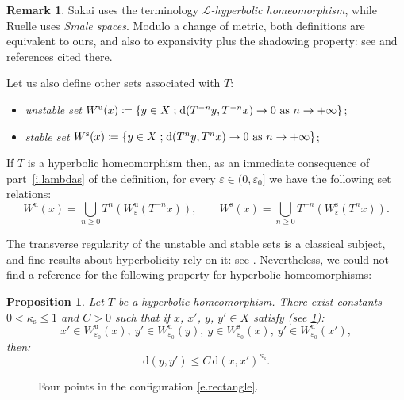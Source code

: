 \documentclass[JEP,XML,SOM,Unicode]{cedram}
\let\mathcal\mathscr
\def\vcentcolon{\mathrel{\mathop\ordinarycolon}}
\providecommand\ordinarycolon{:}
\providecommand*\coloneqq{\vcentcolon\mathrel{\mkern-1.2mu}=}
\theoremstyle{plain}
\newtheorem{proposition}[theorem]{Proposition}
\theoremstyle{definition}
\newtheorem{remark}[theorem]{Remark}
\newcommand{\st}{\;\mathord{;}\;}
\newcommand{\dd}{\mathrm{d}}
\newcommand{\uu}{\mathrm{u}}
\renewcommand{\ss}{\mathrm{s}}
\let\epsilon\varepsilon
\begin{document}
\begin{remark}\label{r.hyperb}
Sakai \cite{Sakai} uses the terminology \emph{$\mathcal{L}$-hyperbolic homeomorphism}, while Ruelle \cite{Ruelle} uses \emph{Smale spaces}. Modulo a change of metric, both definitions are equivalent to ours, and also to expansivity plus the shadowing property: see \cite{Sakai} and references cited there.
\end{remark}

Let us also define other sets associated with $T$:
\begin{itemize}
\item \emph{unstable set} $W^\uu(x) \coloneqq \left\{ y \in X \st \dd(T^{-n} y, T^{-n} x) \to 0 \text{ as } n \to +\infty \right\}$;
\item \emph{stable set} $W^\ss(x) \coloneqq \left\{ y \in X \st \dd(T^{n} y, T^{n} x) \to 0 \text{ as } n \to +\infty \right\}$;
\end{itemize}
If $T$ is a hyperbolic homeomorphism then, as an immediate consequence of part~\eqref{i.lambdas} of the definition, for every $\epsilon \in (0,\epsilon_0]$ we have the following set relations:
\begin{equation}\label{e.longW}
W^\uu(x) = \bigcup_{n\ge 0} T^n(W^\uu_\epsilon(T^{-n} x)), \qquad
W^\ss(x) = \bigcup_{n\ge 0} T^{-n}(W^\ss_\epsilon(T^n x)).
\end{equation}

The transverse regularity of the unstable and stable sets is a classical subject, and fine results about hyperbolicity rely on it: see \cite[Chap.\,19]{KH}.
Nevertheless, we could not find a reference for the following property for hyperbolic homeomorphisms:

\begin{proposition}\label{p.regularity_base}
Let $T$ be a hyperbolic homeomorphism.
There exist constants $0 < \kappa_\ss \le 1$ and $C>0$ such that
if $x$, $x'$, $y$, $y' \in X$ satisfy (see \cref{f.rectangle}):
\begin{equation}\label{e.rectangle}
x' \in W^\uu_{\epsilon_0}(x), \
y' \in W^\uu_{\epsilon_0}(y), \
y \in W^\ss_{\epsilon_0}(x), \
y' \in W^\uu_{\epsilon_0}(x'),
\end{equation}
then:
\[
\dd(y,y') \le C \, \dd(x, x')^{\kappa_\ss}.
\]
\end{proposition}

\begin{figure}[hbt]
	\begin{center}
	\caption{Four points in the configuration \eqref{e.rectangle}.}
	\label{f.rectangle}
	\end{center}
\end{figure}
\end{document}

